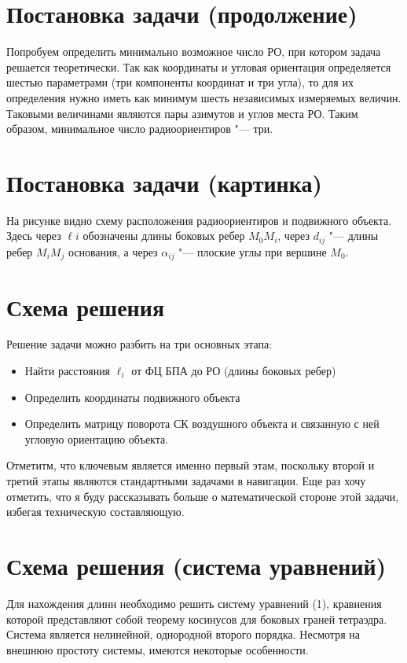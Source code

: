 \documentclass[a4paper, 14pt]{extarticle}
\begin{document}
\section{Постановка задачи (продолжение)}
Попробуем определить минимально возможное число РО, при котором задача решается теоретически.
Так как координаты и угловая ориентация определяется шестью параметрами (три компоненты координат
и три угла), то для их определения нужно иметь как минимум шесть независимых измеряемых величин.
Таковыми величинами являются пары азимутов и углов места РО. Таким образом, минимальное число
радиоориентиров "--- три.

\section{Постановка задачи (картинка)}
На рисунке видно схему расположения радиоориентиров и подвижного объекта. Здесь через $\ell{i}$
обозначены длины боковых ребер $M_0M_i$, через $d_{ij}$ "--- длины ребер $M_iM_j$ основания, а через
$\alpha_{ij}$ "--- плоские углы при вершине $M_0$.

\section{Схема решения}
Решение задачи можно разбить на три основных этапа:
\begin{itemize}
    \item Найти расстояния $\ell_i$ от ФЦ БПА до РО (длины боковых ребер)
    \item Определить координаты подвижного объекта
    \item Определить матрицу поворота СК воздушного объекта и связанную с ней угловую
          ориентацию объекта.
\end{itemize}

Отметитм, что ключевым является именно первый этам, поскольку второй и третий этапы
являются стандартными задачами в навигации. Еще раз хочу отметить, что я буду рассказывать больше
о математической стороне этой задачи, избегая техническую составляющую.

\section{Схема решения (система уравнений)}
Для нахождения длинн необходимо решить систему уравнений (1), кравнения которой
представляют собой теорему косинусов для боковых граней тетраэдра. Система является
нелинейной, однородной второго порядка. Несмотря на внешнюю простоту системы, имеются
некоторые особенности.
\end{document}
